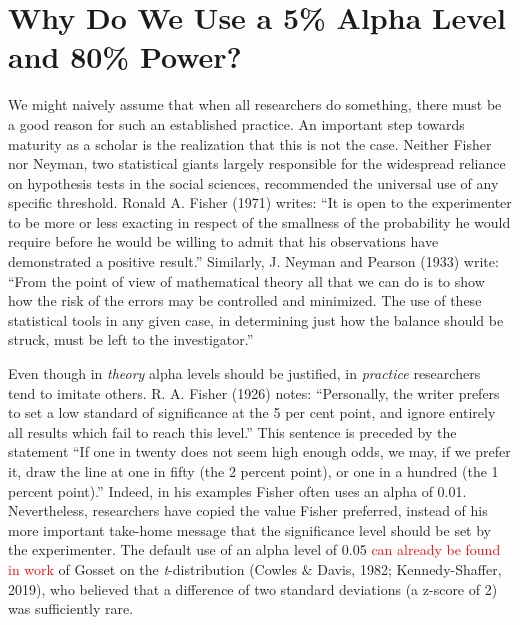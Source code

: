 \documentclass[
  english,
  ,man, a4paper,floatsintext]{apa6}
\begin{document}
\hypertarget{why-do-we-use-a-5-alpha-level-and-80-power}{%
\section{Why Do We Use a 5\% Alpha Level and 80\% Power?}\label{why-do-we-use-a-5-alpha-level-and-80-power}}

We might naively assume that when all researchers do something, there must be a good reason for such an established practice. An important step towards maturity as a scholar is the realization that this is not the case. Neither Fisher nor Neyman, two statistical giants largely responsible for the widespread reliance on hypothesis tests in the social sciences, recommended the universal use of any specific threshold. Ronald A. Fisher (1971) writes: ``It is open to the experimenter to be more or less exacting in respect of the smallness of the probability he would require before he would be willing to admit that his observations have demonstrated a positive result.'' Similarly, J. Neyman and Pearson (1933) write: ``From the point of view of mathematical theory all that we can do is to show how the risk of the errors may be controlled and minimized. The use of these statistical tools in any given case, in determining just how the balance should be struck, must be left to the investigator.''

Even though in \emph{theory} alpha levels should be justified, in \emph{practice} researchers tend to imitate others. R. A. Fisher (1926) notes: ``Personally, the writer prefers to set a low standard of significance at the 5 per cent point, and ignore entirely all results which fail to reach this level.'' This sentence is preceded by the statement ``If one in twenty does not seem high enough odds, we may, if we prefer it, draw the line at one in fifty (the 2 percent point), or one in a hundred (the 1 percent point).'' Indeed, in his examples Fisher often uses an alpha of 0.01. Nevertheless, researchers have copied the value Fisher preferred, instead of his more important take-home message that the significance level should be set by the experimenter. The default use of an alpha level of 0.05 \textcolor{red}{can already be found in work} of Gosset on the \emph{t}-distribution (Cowles \& Davis, 1982; Kennedy-Shaffer, 2019), who believed that a difference of two standard deviations (a z-score of 2) was sufficiently rare.
\end{document}
